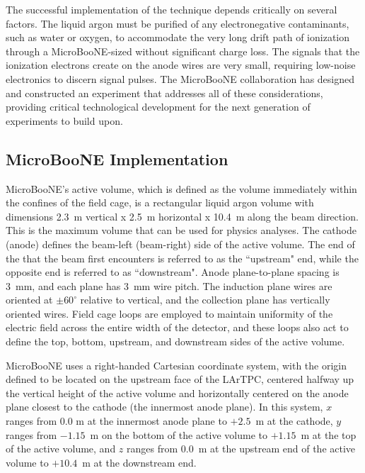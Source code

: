 The successful implementation of the \lartpc technique depends critically on several factors.   The liquid argon must be purified of any electronegative contaminants, such as water or oxygen, to accommodate the very long drift path of ionization through a MicroBooNE-sized \lartpc without significant charge loss.  The signals that the ionization electrons create on the anode wires are very small, requiring low-noise electronics to discern signal pulses.  The MicroBooNE collaboration has designed and constructed an experiment that addresses all of these considerations, providing critical technological development for the next generation of \lartpc experiments to build upon. 

 


\subsection{MicroBooNE \lartpc Implementation}

MicroBooNE's \lartpc active volume, which is defined as the volume immediately within the confines of the \lartpc field cage, is a rectangular liquid argon volume with dimensions 2.3~m vertical x 2.5~m horizontal x 10.4~m along the beam direction. This is the maximum volume that can be used for physics analyses.  The cathode (anode) defines the beam-left (beam-right) side of the active volume.  The end of the \lartpc that the beam first encounters is referred to as the ``upstream" end, while the opposite end is referred to as ``downstream".  Anode plane-to-plane spacing is 3~mm, and each plane has 3~mm wire pitch. The induction plane wires are oriented at $\pm60^{\circ}$ relative to vertical, and the collection plane has vertically oriented wires. Field cage loops are employed to maintain uniformity of the electric field across the entire width of the detector, and these loops also act to define the top, bottom, upstream, and downstream sides of the active volume.  

MicroBooNE uses a right-handed Cartesian coordinate system, with the origin defined to be located on the upstream face of the LArTPC, centered halfway up the vertical height of the active volume and horizontally centered on the anode plane closest to the cathode (the innermost anode plane).  In this system, $x$ ranges from 0.0 m at the innermost anode plane to $+2.5$~m at the cathode, $y$ ranges from $-1.15$~m on the bottom of the active volume to $+1.15$~m at the top of the active volume, and $z$ ranges from 0.0~m at the upstream end of the active volume to $+10.4$~m at the downstream end.  

